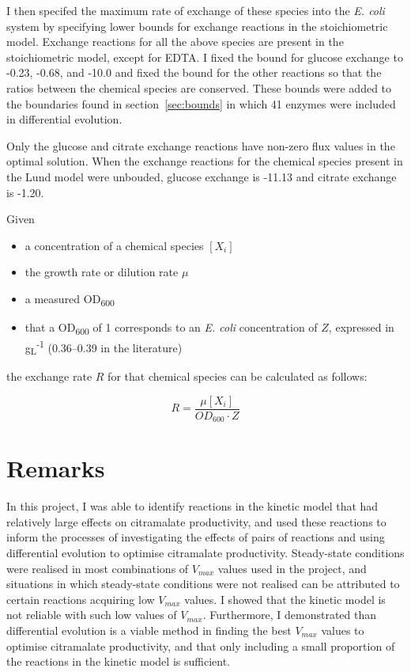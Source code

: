 \documentclass[parskip=full]{scrreprt}
\begin{document}
I then specifed the maximum rate of exchange of these species into the \emph{E. coli} system by specifying lower bounds for exchange reactions in the stoichiometric model. Exchange reactions for all the above species are present in the stoichiometric model, except for EDTA. I fixed the bound for glucose exchange to -0.23, -0.68, and -10.0 and fixed the bound for the other reactions so that the ratios between the chemical species are conserved. These bounds were added to the boundaries found in section~\ref{sec:bounds} in which 41 enzymes were included in differential evolution.

Only the glucose and citrate exchange reactions have non-zero flux values in the optimal solution. When the exchange reactions for the chemical species present in the Lund model were unbouded, glucose exchange is -11.13 and citrate exchange is -1.20.

Given
\begin{itemize}
\item a concentration of a chemical species $[X_{i}]$
\item the growth rate or dilution rate $\mu$
\item a measured OD\textsubscript{600}
\item that a OD\textsubscript{600} of 1 corresponds to an \emph{E. coli} concentration of $Z$, expressed in g\textsubscript L\textsuperscript{-1} (0.36--0.39 in the literature) %
\end{itemize}
  
the exchange rate $R$ for that chemical species can be calculated as follows:

\[
  R = \frac{\mu[X_{i}]}{OD_{600} \cdot Z}
\]

\chapter{Remarks}
\label{ch:remarks}

In this project, I was able to identify reactions in the kinetic model that had relatively large effects on citramalate productivity, and used these reactions to inform the processes of investigating the effects of pairs of reactions and using differential evolution to optimise citramalate productivity. Steady-state conditions were realised in most combinations of $V_{max}$ values used in the project, and situations in which steady-state conditions were not realised can be attributed to certain reactions acquiring low $V_{max}$ values. I showed that the kinetic model is not reliable with such low values of $V_{max}$. Furthermore, I demonstrated than differential evolution is a viable method in finding the best $V_{max}$ values to optimise citramalate productivity, and that only including a small proportion of the reactions in the kinetic model is sufficient.
\end{document}
